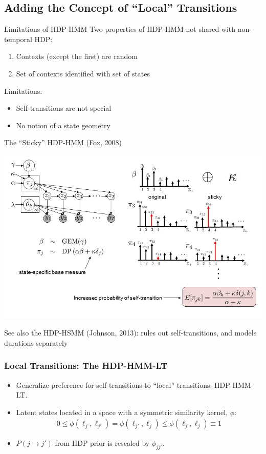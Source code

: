 \documentclass[11pt, mathserif, handout, table]{beamer}
\begin{document}
\subsection{Adding the Concept of ``Local'' Transitions}
\begin{frame}{Limitations of HDP-HMM}
  Two properties of HDP-HMM not shared with non-temporal HDP:
  \begin{enumerate}
  \item Contexts (except the first) are random
  \item Set of contexts identified with set of states
  \end{enumerate}
  Limitations:
  \begin{itemize}
  \item Self-transitions are not special
  \item No notion of a state geometry
  \end{itemize}
\end{frame}

\begin{frame}{The ``Sticky'' HDP-HMM (Fox, 2008)}
  \begin{center}
    \includegraphics[width=\textwidth]{img/sticky_hdp-hmm.png}

  See also the HDP-HSMM (Johnson, 2013): rules out self-transitions, 
  and models durations separately
  \end{center}
\end{frame}

\begin{frame}
  \frametitle{Local Transitions: The HDP-HMM-LT}
  \begin{itemize}[<+->]
  \item Generalize preference for self-transitions to ``local'' transitions: HDP-HMM-LT.
  \item Latent states located in a space 
    with a symmetric similarity kernel, $\phi$:
    \begin{align}
      0 \leq \phi(\ell_j, \ell_{j'}) = \phi(\ell_{j'}, \ell_j) \leq \phi(\ell_j, \ell_j) \equiv 1
    \end{align}
  \item $P(j \to j')$ from HDP prior is rescaled by $\phi_{jj'}$.
  \end{itemize}
\end{frame}
\end{document}
